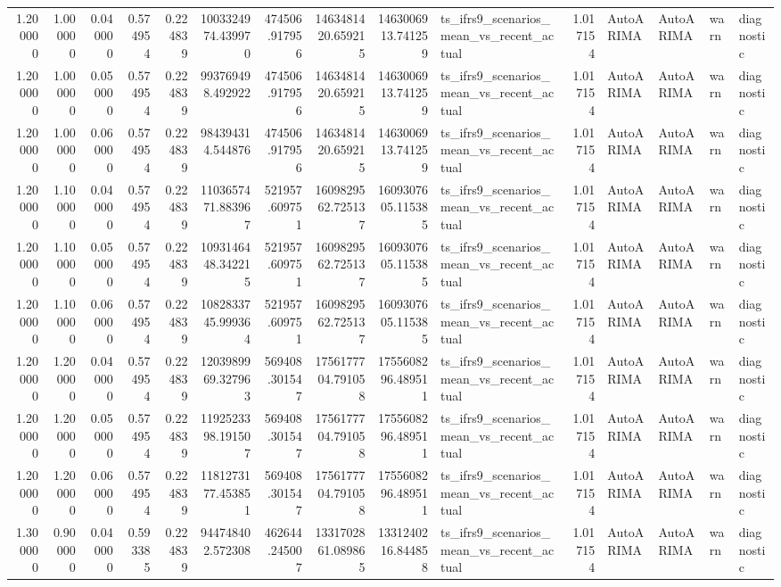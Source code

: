 \begin{tabular}{rrrrrrrrrlrllll}
1.200000 & 1.000000 & 0.040000 & 0.574954 & 0.224839 & 1003324974.439970 & 474506.917956 & 1463481420.659215 & 1463006913.741259 & ts_ifrs9_scenarios_mean_vs_recent_actual & 1.017154 & AutoARIMA & AutoARIMA & warn & diagnostic \\
1.200000 & 1.000000 & 0.050000 & 0.574954 & 0.224839 & 993769498.492922 & 474506.917956 & 1463481420.659215 & 1463006913.741259 & ts_ifrs9_scenarios_mean_vs_recent_actual & 1.017154 & AutoARIMA & AutoARIMA & warn & diagnostic \\
1.200000 & 1.000000 & 0.060000 & 0.574954 & 0.224839 & 984394314.544876 & 474506.917956 & 1463481420.659215 & 1463006913.741259 & ts_ifrs9_scenarios_mean_vs_recent_actual & 1.017154 & AutoARIMA & AutoARIMA & warn & diagnostic \\
1.200000 & 1.100000 & 0.040000 & 0.574954 & 0.224839 & 1103657471.883967 & 521957.609751 & 1609829562.725137 & 1609307605.115385 & ts_ifrs9_scenarios_mean_vs_recent_actual & 1.017154 & AutoARIMA & AutoARIMA & warn & diagnostic \\
1.200000 & 1.100000 & 0.050000 & 0.574954 & 0.224839 & 1093146448.342215 & 521957.609751 & 1609829562.725137 & 1609307605.115385 & ts_ifrs9_scenarios_mean_vs_recent_actual & 1.017154 & AutoARIMA & AutoARIMA & warn & diagnostic \\
1.200000 & 1.100000 & 0.060000 & 0.574954 & 0.224839 & 1082833745.999364 & 521957.609751 & 1609829562.725137 & 1609307605.115385 & ts_ifrs9_scenarios_mean_vs_recent_actual & 1.017154 & AutoARIMA & AutoARIMA & warn & diagnostic \\
1.200000 & 1.200000 & 0.040000 & 0.574954 & 0.224839 & 1203989969.327963 & 569408.301547 & 1756177704.791058 & 1755608296.489511 & ts_ifrs9_scenarios_mean_vs_recent_actual & 1.017154 & AutoARIMA & AutoARIMA & warn & diagnostic \\
1.200000 & 1.200000 & 0.050000 & 0.574954 & 0.224839 & 1192523398.191507 & 569408.301547 & 1756177704.791058 & 1755608296.489511 & ts_ifrs9_scenarios_mean_vs_recent_actual & 1.017154 & AutoARIMA & AutoARIMA & warn & diagnostic \\
1.200000 & 1.200000 & 0.060000 & 0.574954 & 0.224839 & 1181273177.453851 & 569408.301547 & 1756177704.791058 & 1755608296.489511 & ts_ifrs9_scenarios_mean_vs_recent_actual & 1.017154 & AutoARIMA & AutoARIMA & warn & diagnostic \\
1.300000 & 0.900000 & 0.040000 & 0.593385 & 0.224839 & 944748402.572308 & 462644.245007 & 1331702861.089865 & 1331240216.844858 & ts_ifrs9_scenarios_mean_vs_recent_actual & 1.017154 & AutoARIMA & AutoARIMA & warn & diagnostic \\

\end{tabular}
